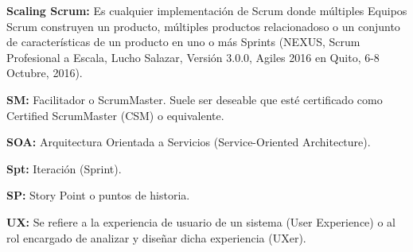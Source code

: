 \begin{description}
  \item {\textbf{Scaling Scrum:} Es cualquier implementación de Scrum donde múltiples Equipos Scrum construyen un producto, múltiples productos relacionadoso o un conjunto de características de un producto en uno o más Sprints (NEXUS, Scrum Profesional a Escala, Lucho Salazar, Versión 3.0.0,  Agiles 2016 en Quito, 6-8 Octubre, 2016).}
  
  \item {\textbf{SM:} Facilitador o ScrumMaster. Suele ser deseable que esté certificado como Certified ScrumMaster (CSM) o equivalente. }
  
  \item {\textbf{SOA:} Arquitectura Orientada a Servicios (Service-Oriented Architecture).}
  
  \item {\textbf{Spt:} Iteración (Sprint).}
  
  \item {\textbf{SP:} Story Point o puntos de historia.}
  
  \item {\textbf{UX:} Se refiere a la experiencia de usuario de un sistema (User Experience) o al rol encargado de analizar y diseñar dicha experiencia (UXer).}
  
\end{description}
  
